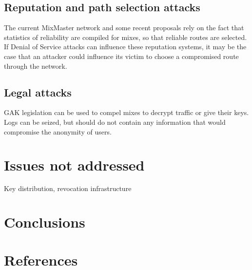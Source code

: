 \documentclass{article}
\begin{document}
\subsection{Reputation and path selection attacks}

The current MixMaster network and some recent proposals rely on the
fact that statistics of reliability are compiled for mixes, so that
reliable routes are selected. If Denial of Service attacks can
influence these reputation systems, it may be the case that an
attacker could influence its victim to choose a compromised route
through the network.

\subsection{Legal attacks}

GAK legislation can be used to compel mixes to decrypt traffic or give
their keys. Logs can be seized, but should do not contain any
information that would compromise the anonymity of users.

\section{Issues not addressed}

Key distribution, revocation infrastructure

\section{Conclusions}
\section{References}
\end{document}
